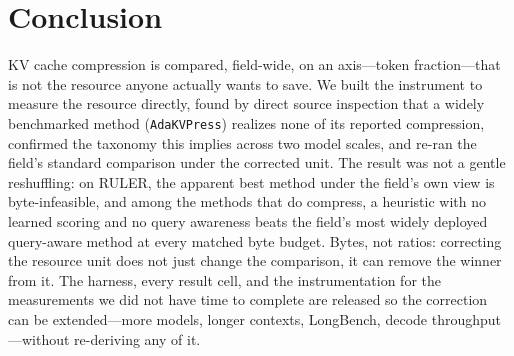 \documentclass[11pt]{article}
\begin{document}
\section{Conclusion}
\label{sec:conclusion}
KV cache compression is compared, field-wide, on an axis---token fraction---that is not the
resource anyone actually wants to save. We built the instrument to measure the resource directly,
found by direct source inspection that a widely benchmarked method (\texttt{AdaKVPress}) realizes
none of its reported compression, confirmed the taxonomy this implies across two model scales, and
re-ran the field's standard comparison under the corrected unit. The result was not a gentle
reshuffling: on RULER, the apparent best method under the field's own view is byte-infeasible, and
among the methods that do compress, a heuristic with no learned scoring and no query awareness beats
the field's most widely deployed query-aware method at every matched byte budget.
Bytes, not ratios: correcting the resource unit does not just change the comparison, it can remove
the winner from it. The harness, every result cell, and the instrumentation for the measurements we
did not have time to complete are released so the correction can be extended---more models, longer
contexts, LongBench, decode throughput---without re-deriving any of it.



\end{document}
